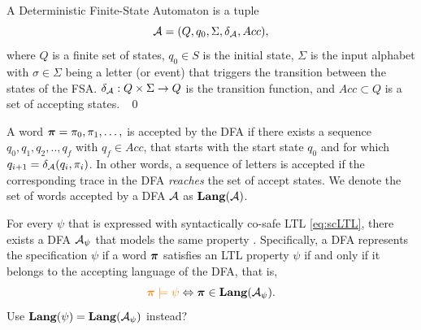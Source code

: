\documentclass{ifacconf}
\newcommand{\new}[1]{{\color{blue}#1}}
\newcommand{\cristi}[1]{{\color{orange}#1}}
\begin{document}
\begin{definition}
A Deterministic Finite-State Automaton is a tuple
 \[\mathcal{A} = (Q, q_0, \Sigma, \delta_{\mathcal{A}}, Acc),\] where %
$Q$ is a finite set of states, $q_0 \in S$ is the initial state,
$\Sigma$ is the input alphabet with $\sigma\in\Sigma$ being a letter (or event) that triggers the transition between the states of the FSA.   
$\delta_{\mathcal{A}} : Q \times \Sigma \rightarrow Q$ is the transition function, and
$Acc\subset Q$ is a set of accepting states. \hfill \mbox{ }\qed
\end{definition}
\new{A word ${\boldsymbol{\pi}} = \pi_0, \pi_1,\ldots,$ is accepted by the DFA if there exists a sequence $q_0,q_1, q_2, .., q_f$ with $q_f\in Acc$, that starts with the start state $q_0$  and for which $q_{i+1}=\delta_{\mathcal{A}}(q_i,\pi_i)$.
In other words, a sequence of letters is accepted if the corresponding trace in the DFA {\it reaches} the set of accept states. We denote the set of words accepted by a DFA $\mathcal{A}$ as $\mathbf{Lang} (\mathcal A)$.}





For every $\psi$ that is expressed with syntactically co-safe LTL  \eqref{eq:scLTL}, there exists a DFA  $\mathcal{A}_\psi$ that models the same property \citep{Belta2017}. Specifically, a DFA represents the specification $\psi$ if a word ${\boldsymbol{\pi}}$ satisfies an LTL property $\psi$ if and only if it belongs to the accepting language of the DFA, that is,
	 \[\cristi{\word\models\psi} \Leftrightarrow \word\in \Language(\FSA_\psi).\] \cristi{Use $\mathbf{Lang}(\psi) = \mathbf{Lang}(\mathcal{A}_\psi)$ instead?}
\end{document}
